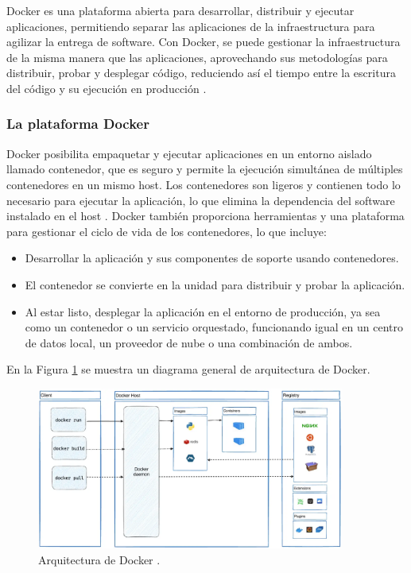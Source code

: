 Docker es una plataforma abierta para desarrollar, distribuir y ejecutar
aplicaciones, permitiendo separar las aplicaciones de la infraestructura para
agilizar la entrega de software. Con Docker, se puede gestionar la infraestructura
de la misma manera que las aplicaciones, aprovechando sus metodologías para
distribuir, probar y desplegar código, reduciendo así el tiempo entre la escritura
del código y su ejecución en producción \cite{docker_overview}.

\subsubsection{La plataforma Docker}
Docker posibilita empaquetar y ejecutar aplicaciones en un entorno aislado
llamado contenedor, que es seguro y permite la ejecución simultánea de múltiples
contenedores en un mismo host. Los contenedores son ligeros y contienen todo lo
necesario para ejecutar la aplicación, lo que elimina la dependencia del software
instalado en el host \cite{docker_overview}. Docker también proporciona herramientas y una plataforma
para gestionar el ciclo de vida de los contenedores, lo que incluye:

\begin{itemize}
    \item Desarrollar la aplicación y sus componentes de soporte usando contenedores.
    \item El contenedor se convierte en la unidad para distribuir y probar la aplicación.
    \item Al estar listo, desplegar la aplicación en el entorno de producción,
      ya sea como un contenedor o un servicio orquestado, funcionando igual en
      un centro de datos local, un proveedor de nube o una combinación de ambos.
\end{itemize}

En la Figura \ref{fig:docker} se muestra un diagrama general de arquitectura
de Docker.

\begin{figure}[!htbp]
  \centering
  \includegraphics[width=0.9\textwidth]{imagenes/02-marco-teorico/arquitectura-docker.png}
  \caption[Arquitectura de Docker]{Arquitectura de Docker \cite{docker_overview}.}
  \label{fig:docker}
\end{figure}


